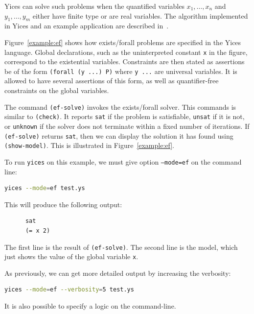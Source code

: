 \documentclass[11pt,twoside,fleqn,openright,titlepage]{cslreport}
\begin{document}
\medskip\noindent
Yices can solve such problems when the quantified variables
$x_1,\ldots,x_n$ and $y_1,\ldots,y_m$ either have finite type or are
real variables. The algorithm implemented in Yices and an example
application are described in~\cite{Gascon+etal:fmcad2014}.

\medskip\noindent Figure~\ref{example:ef} shows how exists/forall
problems are specified in the Yices language. Global declarations,
such as the uninterpreted constant \texttt{x} in the figure,
correspond to the existential variables.  Constraints are then stated
as assertions be of the form \texttt{(forall (y ...) P)} where
\texttt{y ...} are universal variables. It is allowed to have several
assertions of this form, as well as quantifier-free constraints on the
global variables.

\medskip\noindent
The command \texttt{(ef-solve)} invokes the exists/forall solver. This
commands is similar to \texttt{(check)}. It reports \texttt{sat} if
the problem is satisfiable, \texttt{unsat} if it is not, or
\texttt{unknown} if the solver does not terminate within a fixed
number of iterations. If \texttt{(ef-solve)} returns \texttt{sat},
then we can display the solution it has found using \texttt{(show-model)}.
This is illustrated in Figure~\ref{example:ef}.

\medskip\noindent
To run \texttt{yices} on this example, we must give option
\texttt{--mode=ef} on the command line:
\begin{small}
\begin{lstlisting}[language=sh,deletekeywords={test}]
   yices --mode=ef test.ys
\end{lstlisting}
\end{small}
This will produce the following output:
\begin{small}
\begin{verbatim}
      sat
      (= x 2)
\end{verbatim}
\end{small}
The first line is the result of \texttt{(ef-solve)}. The second line
is the model, which just shows the value of the global variable
\texttt{x}.

\medskip\noindent
As previously, we can get more detailed output by increasing the verbosity:
\begin{small}
\begin{lstlisting}[language=sh]
   yices --mode=ef --verbosity=5 test.ys
\end{lstlisting}
\end{small}
It is also possible to specify a logic on the command-line.
\end{document}
